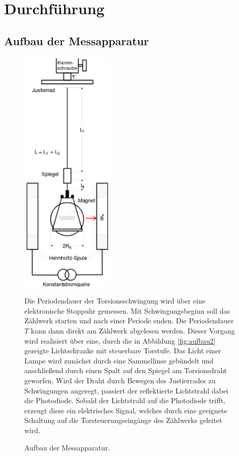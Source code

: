 \section{Durchführung}
\label{sec:Durchfuehrung}
\subsection{Aufbau der Messapparatur}
\begin{figure}
\begin{minipage}[l]{0.49\textwidth}
	\centering
	\includegraphics[width=0.4\textwidth]{Bilder/Aufbau1.pdf}
	\caption{Aufbau der Messapparatur. \cite{V102}}
	\label{fig:aufbau1}
\end{minipage}
\begin{minipage}[r]{0.49\textwidth}
	Die Periodendauer der Torsionsschwingung wird über eine elektronische Stoppuhr gemessen. 
	Mit Schwingungsbeginn soll das Zählwerk starten und nach einer Periode enden. Die Periodendauer $T$ kann dann direkt am Zählwerk abgelesen werden.
	Dieser Vorgang wird realisiert über eine, durch die in Abbildung \ref{fig:aufbau2} gezeigte Lichtschranke mit steuerbare Torstufe. 
	Das Licht einer Lampe wird zunächst durch eine Sammellinse gebündelt und anschließend durch einen Spalt auf den Spiegel am Torsionsdraht geworfen. Wird der Draht durch Bewegen des Justierrades zu Schwingungen angeregt, passiert der reflektierte Lichtstrahl dabei die Photodiode. 
	Sobald der Lichtstrahl auf die Photodiode trifft, erzeugt diese ein elektrisches Signal, welches durch eine geeignete Schaltung auf die Torsteuerungseingänge des Zählwerks geleitet wird.
\end{minipage}
\end{figure}

